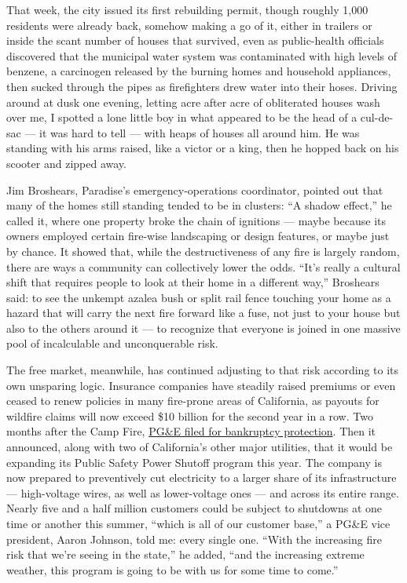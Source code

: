 That week, the city issued its first rebuilding permit, though roughly
1,000 residents were already back, somehow making a go of it, either in
trailers or inside the scant number of houses that survived, even as
public-health officials discovered that the municipal water system was
contaminated with high levels of benzene, a carcinogen released by the
burning homes and household appliances, then sucked through the pipes as
firefighters drew water into their hoses. Driving around at dusk one
evening, letting acre after acre of obliterated houses wash over me, I
spotted a lone little boy in what appeared to be the head of a
cul-de-sac --- it was hard to tell --- with heaps of houses all around
him. He was standing with his arms raised, like a victor or a king, then
he hopped back on his scooter and zipped away.

Jim Broshears, Paradise's emergency-operations coordinator, pointed out
that many of the homes still standing tended to be in clusters: ``A
shadow effect,'' he called it, where one property broke the chain of
ignitions --- maybe because its owners employed certain fire-wise
landscaping or design features, or maybe just by chance. It showed that,
while the destructiveness of any fire is largely random, there are ways
a community can collectively lower the odds. ``It's really a cultural
shift that requires people to look at their home in a different way,''
Broshears said: to see the unkempt azalea bush or split rail fence
touching your home as a hazard that will carry the next fire forward
like a fuse, not just to your house but also to the others around it ---
to recognize that everyone is joined in one massive pool of incalculable
and unconquerable risk.

The free market, meanwhile, has continued adjusting to that risk
according to its own unsparing logic. Insurance companies have steadily
raised premiums or even ceased to renew policies in many fire-prone
areas of California, as payouts for wildfire claims will now exceed \$10
billion for the second year in a row. Two months after the Camp Fire,
\href{https://www.nytimes.com/2019/07/11/business/energy-environment/wildfire-california-utilities.html}{PG\&E
filed for bankruptcy protection}. Then it announced, along with two of
California's other major utilities, that it would be expanding its
Public Safety Power Shutoff program this year. The company is now
prepared to preventively cut electricity to a larger share of its
infrastructure --- high-voltage wires, as well as lower-voltage ones ---
and across its entire range. Nearly five and a half million customers
could be subject to shutdowns at one time or another this summer,
``which is all of our customer base,'' a PG\&E vice president, Aaron
Johnson, told me: every single one. ``With the increasing fire risk that
we're seeing in the state,'' he added, ``and the increasing extreme
weather, this program is going to be with us for some time to come.''

